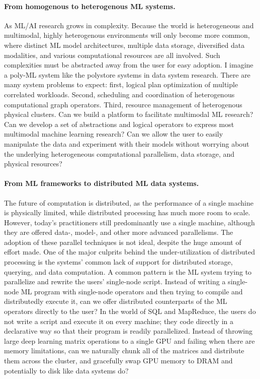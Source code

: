 \documentclass[letterpaper]{article}
\begin{document}
\paragraph{From homogenous to heterogenous ML systems.} As ML/AI research grows in complexity. Because the world is heterogeneous and multimodal, highly heterogenous environments will only become more common, where distinct ML model architectures, multiple data storage, diversified data modalities, and various computational resources are all involved. Such complexities must be abstracted away from the user for easy adoption. I imagine a poly-ML system like the polystore systems in data system research. There are many system problems to expect: first, logical plan optimization of multiple correlated workloads. Second, scheduling and coordination of heterogenous computational graph operators. Third, resource management of heterogenous physical clusters. Can we build a platform to facilitate multimodal ML research? Can we develop a set of abstractions and logical operators to express most multimodal machine learning research? Can we allow the user to easily manipulate the data and experiment with their models without worrying about the underlying heterogeneous computational parallelism, data storage, and physical resources? 

\paragraph{From ML frameworks to distributed ML data systems.} The future of computation is distributed, as the performance of a single machine is physically limited, while distributed processing has much more room to scale. However, today's practitioners still predominantly use a single machine, although they are offered data-, model-, and other more advanced parallelisms. The adoption of these parallel techniques is not ideal, despite the huge amount of effort made. One of the major culprits behind the under-utilization of distributed processing is the systems' common lack of support for distributed storage, querying, and data computation. A common pattern is the ML system trying to parallelize and rewrite the users' single-node script. Instead of writing a single-node ML program with single-node operators and then trying to compile and distributedly execute it, can we offer distributed counterparts of the ML operators directly to the user? In the world of SQL and MapReduce, the users do not write a script and execute it on every machine; they code directly in a declarative way so that their program is readily parallelized. Instead of throwing large deep learning matrix operations to a single GPU and failing when there are memory limitations, can we naturally chunk all of the matrices and distribute them across the cluster, and gracefully swap GPU memory to DRAM and potentially to disk like data systems do? 
\end{document}
